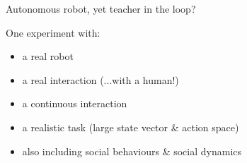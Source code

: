 \documentclass[xcolor=table]{beamer}
\begin{document}
\begin{frame}{Autonomous robot, yet teacher in the loop?}

    One experiment with:
    
    \begin{itemize}
        \item<+-> a real robot
        \item<+-> a real interaction (...with a human!)
        \item<+-> a continuous interaction
        \item<+-> a realistic task (large state vector \& action space)
        \item<+-> also including social behaviours \& social dynamics
    \end{itemize}

\end{frame}
\end{document}
